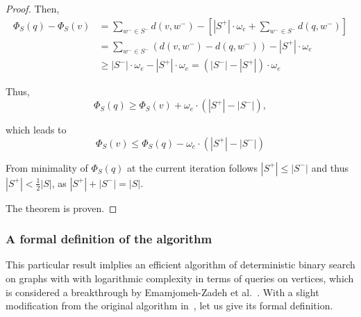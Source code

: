 \begin{proof}
	Then,
	\begin{align*}
	\Phi_S(q) - \Phi_S(v) &= \sum \limits_{w^- \in S^-} d(v, w^-) - \left[|S^+| \cdot \omega_e + \sum \limits_{w^- \in S^-} d(q, w^-)\right] \\
	                      &= \sum \limits_{w^- \in S^-} \left(d(v, w^-) - d(q, w^-)\right) - |S^+| \cdot \omega_e \\
	                      &\ge |S^-| \cdot \omega_e - |S^+| \cdot \omega_e = \left(|S^-| - |S^+|\right) \cdot \omega_e
	\end{align*}


	Thus,
	\begin{equation*}
		\Phi_S(q) \ge \Phi_S(v) + \omega_e \cdot \left(|S^+| - |S^-|\right),
	\end{equation*}
	

	which leads to
	\begin{equation*}
		\Phi_S(v) \le \Phi_S(q) - \omega_e \cdot \left(|S^+| - |S^-|\right)
	\end{equation*}


	From minimality of $\Phi_S(q)$ at the current iteration follows $|S^+| \le |S^-|$ and thus $|S^+| < \frac{1}{2}|S|$, as $|S^+| + |S^-| = |S|$.


	The theorem is proven.
\end{proof}


\clearpage
\subsubsection*{A formal definition of the algorithm}
This particular result imlplies an efficient algorithm of deterministic binary search on graphs with with logarithmic complexity in terms of queries on vertices, which is considered a breakthrough by Emamjomeh-Zadeh et al.~\cite{main}. With a slight modification from the original algorithm in~\cite{main}, let us give its formal definition.

